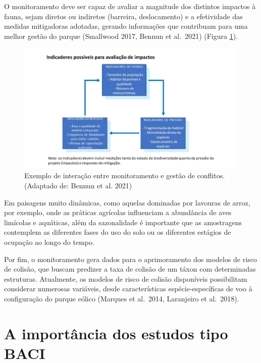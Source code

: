 \documentclass[
  oneside]{scrbook}
\begin{document}
O monitoramento deve ser capaz de avaliar a magnitude dos distintos impactos à fauna, sejam diretos ou indiretos (barreira, deslocamento) e a efetividade das medidas mitigadoras adotadas, gerando informações que contribuam para uma melhor gestão do parque (Smallwood 2017, Bennun et al.~2021) (Figura \ref{fig:19}).

\begin{figure}

{\centering \includegraphics[width=0.85\linewidth]{imagens/cap06/Figura_6.2} 

}

\caption{Exemplo de interação entre monitoramento e gestão de conflitos. (Adaptado de: Bennun et al. 2021)}\label{fig:19}
\end{figure}

Em paisagens muito dinâmicas, como aquelas dominadas por lavouras de arroz, por exemplo, onde as práticas agrícolas influenciam a abundância de aves limícolas e aquáticas, além da sazonalidade é importante que as amostragens contemplem as diferentes fases do uso do solo ou os diferentes estágios de ocupação ao longo do tempo.

Por fim, o monitoramento gera dados para o aprimoramento dos modelos de risco de colisão, que buscam predizer a taxa de colisão de um táxon com determinadas estruturas. Atualmente, os modelos de risco de colisão disponíveis possibilitam considerar numerosas variáveis, desde características espécie-específicas de voo à configuração do parque eólico (Marques et al.~2014, Laranjeiro et al.~2018).

\hypertarget{a-importuxe2ncia-dos-estudos-tipo-baci}{%
\section{A importância dos estudos tipo BACI}\label{a-importuxe2ncia-dos-estudos-tipo-baci}}
\end{document}
